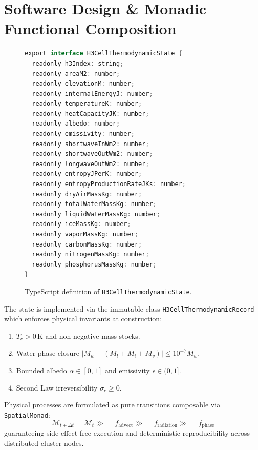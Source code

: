 \documentclass[10pt,twocolumn,a4paper]{article}
\begin{document}
\section{Software Design \& Monadic Functional Composition}

\begin{figure}[t]
\centering
\begin{lstlisting}[language=Java]
export interface H3CellThermodynamicState {
  readonly h3Index: string;
  readonly areaM2: number;
  readonly elevationM: number;
  readonly internalEnergyJ: number;
  readonly temperatureK: number;
  readonly heatCapacityJK: number;
  readonly albedo: number;
  readonly emissivity: number;
  readonly shortwaveInWm2: number;
  readonly shortwaveOutWm2: number;
  readonly longwaveOutWm2: number;
  readonly entropyJPerK: number;
  readonly entropyProductionRateJKs: number;
  readonly dryAirMassKg: number;
  readonly totalWaterMassKg: number;
  readonly liquidWaterMassKg: number;
  readonly iceMassKg: number;
  readonly vaporMassKg: number;
  readonly carbonMassKg: number;
  readonly nitrogenMassKg: number;
  readonly phosphorusMassKg: number;
}
\end{lstlisting}
\caption{TypeScript definition of \texttt{H3CellThermodynamicState}.}
\end{figure}

The state is implemented via the immutable class \texttt{H3CellThermodynamicRecord} which enforces physical invariants at construction:
\begin{enumerate}
\item $T_c > 0\,\mathrm{K}$ and non-negative mass stocks.
\item Water phase closure $|M_w - (M_l + M_i + M_v)| \le 10^{-7} M_w$.
\item Bounded albedo $\alpha \in [0, 1]$ and emissivity $\epsilon \in (0, 1]$.
\item Second Law irreversibility $\sigma_c \ge 0$.
\end{enumerate}

Physical processes are formulated as pure transitions composable via \texttt{SpatialMonad}:
\begin{equation}
\mathcal{M}_{t + \Delta t} = \mathcal{M}_t \gg= f_{\mathrm{advect}} \gg= f_{\mathrm{radiation}} \gg= f_{\mathrm{phase}}
\end{equation}
guaranteeing side-effect-free execution and deterministic reproducibility across distributed cluster nodes.
\end{document}
